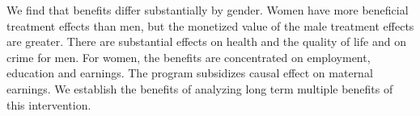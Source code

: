 We find that benefits differ substantially by gender. Women have more beneficial treatment effects than men, but the monetized value of the male treatment effects are greater. There are substantial effects on health and the quality of life and on crime for men. For women, the benefits are concentrated on employment, education and earnings. The program subsidizes causal effect on maternal earnings. We establish the benefits of analyzing long term multiple benefits of this intervention.

\singlespace



 